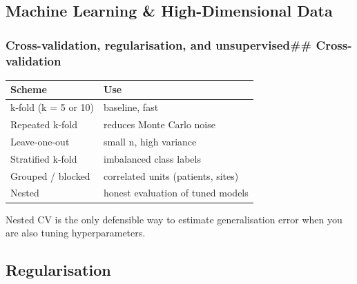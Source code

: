 \documentclass[
]{article}
\newenvironment{Shaded}{\begin{snugshade}}{\end{snugshade}}
\newcommand{\AttributeTok}[1]{\textcolor[rgb]{0.13,0.29,0.53}{#1}}
\newcommand{\CommentTok}[1]{\textcolor[rgb]{0.56,0.35,0.01}{\textit{#1}}}
\newcommand{\DecValTok}[1]{\textcolor[rgb]{0.00,0.00,0.81}{#1}}
\newcommand{\FunctionTok}[1]{\textcolor[rgb]{0.13,0.29,0.53}{\textbf{#1}}}
\newcommand{\NormalTok}[1]{#1}
\newcommand{\OtherTok}[1]{\textcolor[rgb]{0.56,0.35,0.01}{#1}}
\newcommand{\SpecialCharTok}[1]{\textcolor[rgb]{0.81,0.36,0.00}{\textbf{#1}}}
\newcommand{\StringTok}[1]{\textcolor[rgb]{0.31,0.60,0.02}{#1}}
\newcounter{none} %
\begin{document}
\subsection{Machine Learning \& High-Dimensional
Data}\label{machine-learning-high-dimensional-data}

\subsubsection{Cross-validation, regularisation, and unsupervised\#\#
Cross-validation}\label{cross-validation-regularisation-and-unsupervised-cross-validation}

{\def\LTcaptype{none} %
\begin{longtable}[]{@{}ll@{}}
\toprule\noalign{}
Scheme & Use \\
\midrule\noalign{}
\endhead
\bottomrule\noalign{}
\endlastfoot
k-fold (k = 5 or 10) & baseline, fast \\
Repeated k-fold & reduces Monte Carlo noise \\
Leave-one-out & small n, high variance \\
Stratified k-fold & imbalanced class labels \\
Grouped / blocked & correlated units (patients, sites) \\
Nested & honest evaluation of tuned models \\
\end{longtable}
}

Nested CV is the only defensible way to estimate generalisation error
when you are also tuning hyperparameters.

\subsection{Regularisation}\label{regularisation}

\begin{Shaded}
\end{Shaded}
\end{document}
